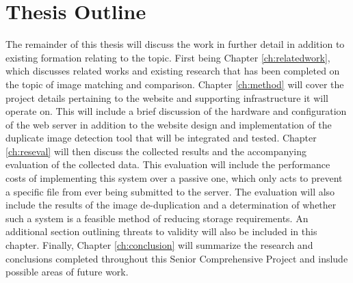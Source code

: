 \section{Thesis Outline}\label{sec:outline}
The remainder of this thesis will discuss the work in further detail in addition to existing formation relating to the topic. First being Chapter \ref{ch:relatedwork}, which discusses related works and existing research that has been completed on the topic of image matching and comparison. Chapter \ref{ch:method} will cover the project details pertaining to the website and supporting infrastructure it will operate on. This will include a brief discussion of the hardware and configuration of the web server in addition to the website design and implementation of the duplicate image detection tool that will be integrated and tested. Chapter \ref{ch:reseval} will then discuss the collected results and the accompanying evaluation of the collected data. This evaluation will include the performance costs of implementing this system over a passive one, which only acts to prevent a specific file from ever being submitted to the server. The evaluation will also include the results of the image de-duplication and a determination of whether such a system is a feasible method of reducing storage requirements. An additional section outlining threats to validity will also be included in this chapter. Finally, Chapter \ref{ch:conclusion} will summarize the research and conclusions completed throughout this Senior Comprehensive Project and inslude possible areas of future work.